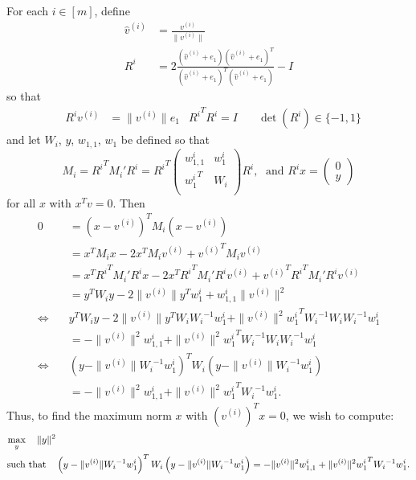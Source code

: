 For each $i \in [m]$, define
\begin{align*}
\hat v^{(i)} & = \frac{v^{(i)}}{\|v^{(i)}\|} \\
R^i & = 2\frac{(\hat v^{(i)} + e_1)(\hat v^{(i)} + e_1)^T}{(\hat v^{(i)} + e_1)^T(\hat v^{(i)} + e_1)} - I
\end{align*}
so that
\begin{align*}
& {R^i}v^{(i)} &= \|v^{(i)}\|e_1 & {R^i}^T{R^i} = I & \quad \det({R^i}) \in \{-1, 1\}
\end{align*}
and let $W_i$, $y$, $w_{1,1}$, $w_1$ be defined so that
\[
M_i = {R^i}^T M_i' {R^i} = {R^i}^T\left( \begin{array}{cc}
{w_{1,1}^i} & {w_1^i} \\
{w_1^i}^T	& {W_i}  \\
\end{array} \right){R^i},  \; \text{ and }
{R^i}x = \left(\begin{array}{c}
0 \\
y
\end{array}\right)
\]
for all $x$ with $x^Tv = 0$.
Then
\begin{align*}
0 &= \left(x - {v^{(i)}}\right)^TM_i\left(x - {v^{(i)}}\right) \\
&= x^TM_ix - 2x^TM_i{v^{(i)}} + {v^{(i)}}^TM_i{v^{(i)}} \\
&= x^T{R^i}^TM_i'{R^i}x - 2x^T{R^i}^TM_i'{R^i}{v^{(i)}} + {v^{(i)}}^T{R^i}^TM_i'{R^i}{v^{(i)}} \\
&= y^T{W_i}y - 2\|v^{(i)}\|y^Tw_1^i + {w_{1,1}^i}\|v^{(i)}\|^2 \\
\Longleftrightarrow \quad & y^T{W_i}y - 2\|v^{(i)}\|y^T{W_i}{W_i}^{-1}{w_1^i} + \|v^{(i)}\|^2{{w_1^i}}^T{W_i}^{-1}{W_i}{W_i}^{-1}{w_1^i} \\
&= - \|v^{(i)}\|^2{w_{1,1}^i} + \|v^{(i)}\|^2{{w_1^i}}^T{W_i}^{-1}{W_i}{W_i}^{-1}{w_1^i} \\
\Longleftrightarrow \quad & \left(y - \|v^{(i)}\|{W_i}^{-1}{w_1^i}\right)^T{W_i}\left(y - \|v^{(i)}\|{W_i}^{-1}{w_1^i}\right) \\
&= - \|v^{(i)}\|^2{w_{1,1}^i} + \|v^{(i)}\|^2{{{w_1^i}}}^T{W_i}^{-1}{{w_1^i}}. 
\end{align*}
Thus, to find the maximum norm $x$ with $\left(v^{(i)}\right)^Tx = 0$, we wish to compute:
\begin{align*}
\max_{y}  \quad \|y\|^2 &  \\
 \textrm{such that} \quad & \left(y - \|v^{(i)}\|{W_i}^{-1}{w_1^i}\right)^T{W_i}\left(y - \|v^{(i)}\|{W_i}^{-1}{w_1^i}\right) = - \|v^{(i)}\|^2{w_{1,1}^i} + \|v^{(i)}\|^2{{w_1^i}}^T{W_i}^{-1}{w_1^i}.
\end{align*}

